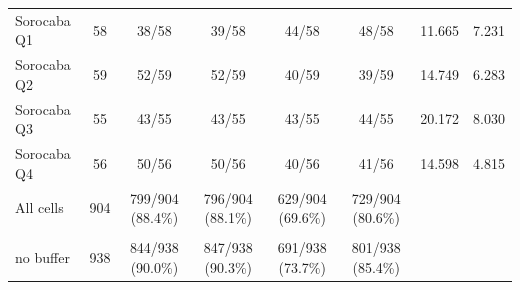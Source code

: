 \begin{tabular}{lccccccc}
Sorocaba Q1 & 58 & 38/58 & 39/58 & 44/58 & 48/58 & 11.665 & 7.231 \\
Sorocaba Q2 & 59 & 52/59 & 52/59 & 40/59 & 39/59 & 14.749 & 6.283 \\
Sorocaba Q3 & 55 & 43/55 & 43/55 & 43/55 & 44/55 & 20.172 & 8.030 \\
Sorocaba Q4 & 56 & 50/56 & 50/56 & 40/56 & 41/56 & 14.598 & 4.815 \\
\midrule
All cells & 904 & 799/904 (88.4\%) & 796/904 (88.1\%) & 629/904 (69.6\%) & 729/904 (80.6\%) & & \\
\celula{All cells, \\ \relax no buffer} & 938 & 844/938 (90.0\%) & 847/938 (90.3\%) & 691/938 (73.7\%) & 801/938 (85.4\%) & & \\
\bottomrule
\end{tabular}
